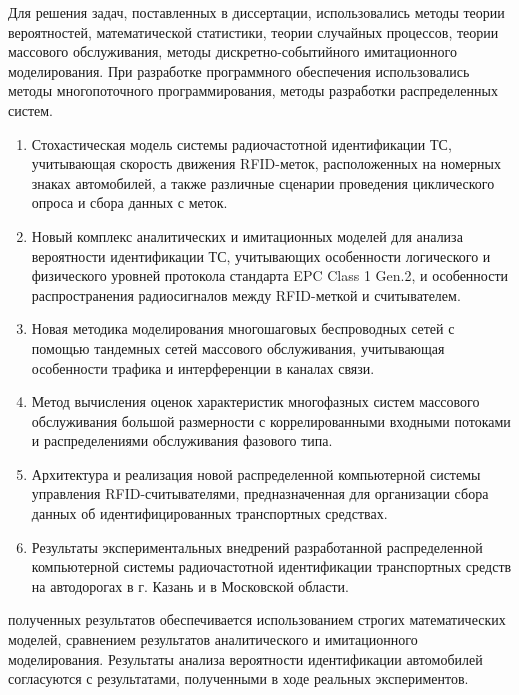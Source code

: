 {\methods} Для решения задач, поставленных в диссертации, использовались методы теории вероятностей, математической статистики, теории случайных процессов, теории массового обслуживания, методы дискретно-событийного имитационного моделирования. При разработке программного обеспечения использовались методы многопоточного программирования, методы разработки распределенных систем.

{}
\begin{enumerate}[beginpenalty=10000] %
    \item Стохастическая модель системы радиочастотной идентификации ТС, учитывающая скорость движения RFID-меток, расположенных на номерных знаках автомобилей, а также различные сценарии проведения циклического опроса и сбора данных с меток.
    \item Новый комплекс аналитических и имитационных моделей для анализа вероятности идентификации ТС, учитывающих особенности логического и физического уровней протокола стандарта EPC Class 1 Gen.2, и особенности распространения радиосигналов между RFID-меткой и считывателем.
    \item Новая методика моделирования многошаговых беспроводных сетей с помощью тандемных сетей массового обслуживания, учитывающая особенности трафика и интерференции в каналах связи.
    \item Метод вычисления оценок характеристик многофазных систем массового обслуживания большой размерности с коррелированными входными потоками и распределениями обслуживания фазового типа.
    \item Архитектура и реализация новой распределенной компьютерной системы управления RFID-считывателями, предназначенная для организации сбора данных об идентифицированных транспортных средствах.
    \item Результаты экспериментальных внедрений разработанной распределенной компьютерной системы радиочастотной идентификации транспортных средств на автодорогах в г. Казань и в Московской области.
\end{enumerate}

{\reliability} полученных результатов обеспечивается использованием строгих математических моделей, сравнением результатов аналитического и имитационного моделирования. Результаты анализа вероятности идентификации автомобилей согласуются с результатами, полученными в ходе реальных экспериментов.



